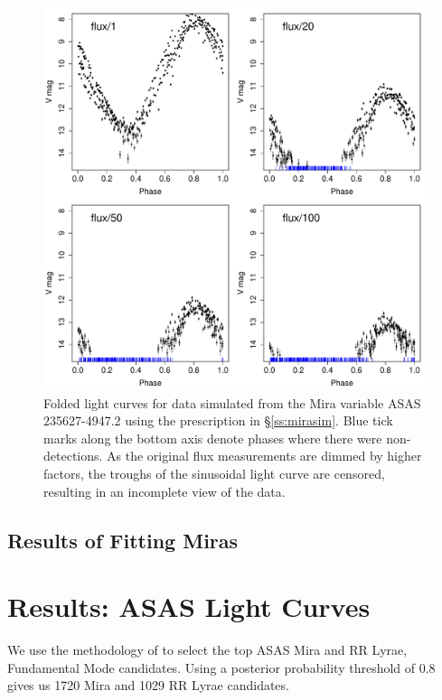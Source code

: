 \documentclass[12pt,preprint]{aastex}
\begin{document}
\begin{figure}
\begin{center}
\includegraphics[angle=0,width=6.5in]{../plots/mira_simulated.pdf}
\end{center}
\caption{ Folded light curves for data simulated from the Mira variable ASAS 235627-4947.2 using the prescription in \S\ref{ss:mirasim}.  Blue tick marks along the bottom axis denote phases where there were non-detections.  As the original flux measurements are dimmed by higher factors, the troughs of the sinusoidal light curve are censored, resulting in an incomplete view of the data.  \label{fig:mirasim}}
\end{figure}


\subsection{Results of Fitting Miras}


\section{Results: ASAS Light Curves}
\label{sec:results}

We use the methodology of \cite{2011arXiv1106.2832R} to select the top ASAS Mira  and RR Lyrae, Fundamental Mode candidates.  Using a posterior probability threshold of 0.8 gives us 1720 Mira  and 1029 RR Lyrae candidates.
 
\end{document}
